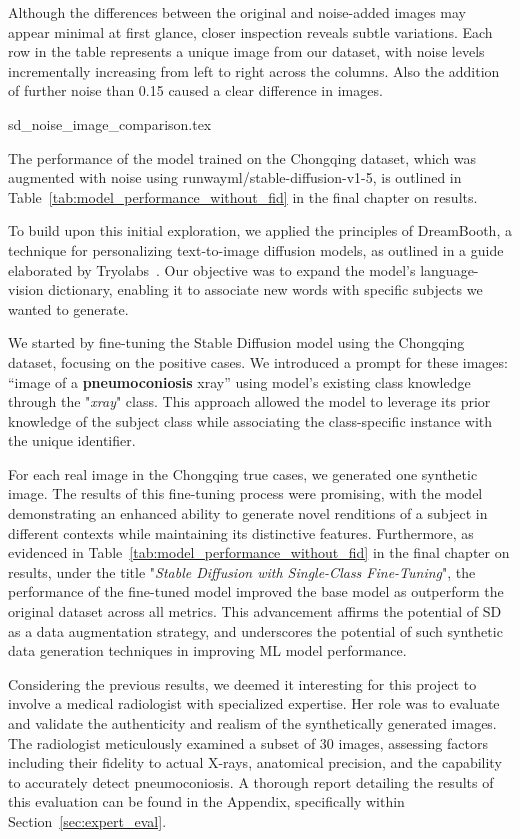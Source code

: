 Although the differences between the original and noise-added images may appear minimal at first glance, closer inspection reveals subtle variations. Each row in the table represents a unique image from our dataset, with noise levels incrementally increasing from left to right across the columns. Also the addition of further noise than 0.15 caused a clear difference in images.

{sd_noise_image_comparison.tex}

The performance of the model trained on the Chongqing dataset, which was augmented with noise using runwayml/stable-diffusion-v1-5, is outlined in Table~\ref{tab:model_performance_without_fid} in the final chapter on results.

To build upon this initial exploration, we applied the principles of DreamBooth, a technique for personalizing text-to-image diffusion models, as outlined in a guide elaborated by Tryolabs~\cite{tryolabsGuideFinetuning}. Our objective was to expand the model's language-vision dictionary, enabling it to associate new words with specific subjects we wanted to generate.

We started by fine-tuning the Stable Diffusion model using the Chongqing dataset, focusing on the positive cases. We introduced a prompt for these images: ``image of a \textbf{pneumoconiosis} xray'' using model's existing class knowledge through the "\textit{xray}" class. This approach allowed the model to leverage its prior knowledge of the subject class while associating the class-specific instance with the unique identifier.

For each real image in the Chongqing true cases, we generated one synthetic image. The results of this fine-tuning process were promising, with the model demonstrating an enhanced ability to generate novel renditions of a subject in different contexts while maintaining its distinctive features. Furthermore, as evidenced in Table~\ref{tab:model_performance_without_fid} in the final chapter on results, under the title "\textit{Stable Diffusion with Single-Class Fine-Tuning}", the performance of the fine-tuned model improved the base model as outperform the original dataset across all metrics. This advancement affirms the potential of SD as a data augmentation strategy, and underscores the potential of such synthetic data generation techniques in improving ML model performance.

Considering the previous results, we deemed it interesting for this project to involve a medical radiologist with specialized expertise. Her role was to evaluate and validate the authenticity and realism of the synthetically generated images. The radiologist meticulously examined a subset of 30 images, assessing factors including their fidelity to actual X-rays, anatomical precision, and the capability to accurately detect pneumoconiosis. A thorough report detailing the results of this evaluation can be found in the Appendix, specifically within Section~\ref{sec:expert_eval}.

